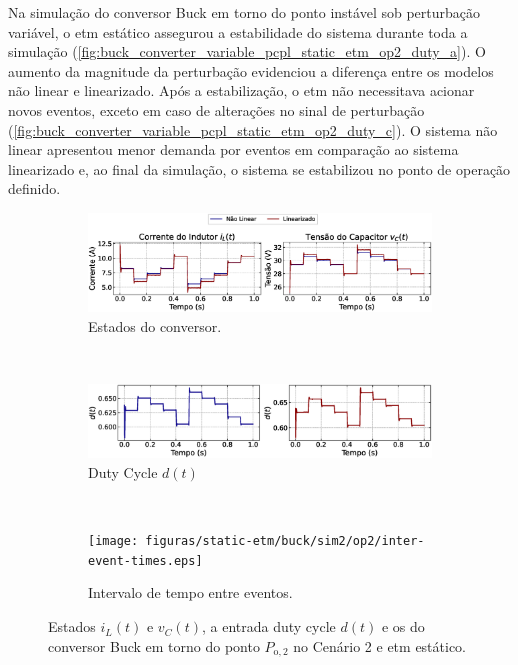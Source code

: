 Na simulação do conversor Buck em torno do ponto instável sob perturbação variável, o \acrshort{etm} estático assegurou a estabilidade do sistema durante toda a simulação (\autoref{fig:buck_converter_variable_pcpl_static_etm_op2_duty_a}). O aumento da magnitude da perturbação evidenciou a diferença entre os modelos não linear e linearizado. Após a estabilização, o \acrshort{etm} não necessitava acionar novos eventos, exceto em caso de alterações no sinal de perturbação (\autoref{fig:buck_converter_variable_pcpl_static_etm_op2_duty_c}). O sistema não linear apresentou menor demanda por eventos em comparação ao sistema linearizado e, ao final da simulação, o sistema se estabilizou no ponto de operação definido.

\begin{figure}[H]
  \centering
  \captionsetup{justification=centering}
  \begin{subfigure}{1.\textwidth}
    \centering
    \includegraphics[width=1.\textwidth]{figuras/static-etm/buck/sim2/op2/result.eps}
    \caption{Estados do conversor.}
    \label{fig:buck_converter_variable_pcpl_static_etm_op2_duty_a}
  \end{subfigure}
  \\[6pt]
  \begin{subfigure}{1.\textwidth}
    \centering
    \includegraphics[width=1.\textwidth]{figuras/static-etm/buck/sim2/op2/duty-cycle.eps}
    \caption{Duty Cycle $d(t)$}
    \label{fig:buck_converter_variable_pcpl_static_etm_op2_duty_b}
  \end{subfigure}
  \\[6pt]
  \begin{subfigure}{1.\textwidth}
    \centering
    \texttt{[image: figuras/static-etm/buck/sim2/op2/inter-event-times.eps]}
    \caption{Intervalo de tempo entre eventos.}
    \label{fig:buck_converter_variable_pcpl_static_etm_op2_duty_c}
  \end{subfigure}
  \caption{Estados $i_L(t)$ e $v_C(t)$, a entrada duty cycle $d(t)$ e os  do conversor Buck em torno do ponto $P_{\mathrm{o}, 2}$ no Cenário 2 e \acrshort{etm} estático.}
\end{figure}

